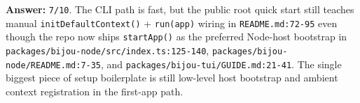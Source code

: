\textbf{Answer:} \texttt{7\allowbreak{}/\allowbreak{}1\allowbreak{}0}. The CLI path is fast, but the public root quick start still teaches manual \texttt{i\allowbreak{}n\allowbreak{}i\allowbreak{}t\allowbreak{}D\allowbreak{}e\allowbreak{}f\allowbreak{}a\allowbreak{}u\allowbreak{}l\allowbreak{}t\allowbreak{}C\allowbreak{}o\allowbreak{}n\allowbreak{}t\allowbreak{}e\allowbreak{}x\allowbreak{}t\allowbreak{}(\allowbreak{})} + \texttt{r\allowbreak{}u\allowbreak{}n\allowbreak{}(\allowbreak{}a\allowbreak{}p\allowbreak{}p\allowbreak{})} wiring in \texttt{R\allowbreak{}E\allowbreak{}A\allowbreak{}D\allowbreak{}M\allowbreak{}E\allowbreak{}.\allowbreak{}m\allowbreak{}d\allowbreak{}:\allowbreak{}7\allowbreak{}2\allowbreak{}-\allowbreak{}9\allowbreak{}5} even though the repo now ships \texttt{s\allowbreak{}t\allowbreak{}a\allowbreak{}r\allowbreak{}t\allowbreak{}A\allowbreak{}p\allowbreak{}p\allowbreak{}(\allowbreak{})} as the preferred Node-host bootstrap in \texttt{p\allowbreak{}a\allowbreak{}c\allowbreak{}k\allowbreak{}a\allowbreak{}g\allowbreak{}e\allowbreak{}s\allowbreak{}/\allowbreak{}b\allowbreak{}i\allowbreak{}j\allowbreak{}o\allowbreak{}u\allowbreak{}-\allowbreak{}n\allowbreak{}o\allowbreak{}d\allowbreak{}e\allowbreak{}/\allowbreak{}s\allowbreak{}r\allowbreak{}c\allowbreak{}/\allowbreak{}i\allowbreak{}n\allowbreak{}d\allowbreak{}e\allowbreak{}x\allowbreak{}.\allowbreak{}t\allowbreak{}s\allowbreak{}:\allowbreak{}1\allowbreak{}2\allowbreak{}5\allowbreak{}-\allowbreak{}1\allowbreak{}4\allowbreak{}0}, \texttt{p\allowbreak{}a\allowbreak{}c\allowbreak{}k\allowbreak{}a\allowbreak{}g\allowbreak{}e\allowbreak{}s\allowbreak{}/\allowbreak{}b\allowbreak{}i\allowbreak{}j\allowbreak{}o\allowbreak{}u\allowbreak{}-\allowbreak{}n\allowbreak{}o\allowbreak{}d\allowbreak{}e\allowbreak{}/\allowbreak{}R\allowbreak{}E\allowbreak{}A\allowbreak{}D\allowbreak{}M\allowbreak{}E\allowbreak{}.\allowbreak{}m\allowbreak{}d\allowbreak{}:\allowbreak{}7\allowbreak{}-\allowbreak{}3\allowbreak{}5}, and \texttt{p\allowbreak{}a\allowbreak{}c\allowbreak{}k\allowbreak{}a\allowbreak{}g\allowbreak{}e\allowbreak{}s\allowbreak{}/\allowbreak{}b\allowbreak{}i\allowbreak{}j\allowbreak{}o\allowbreak{}u\allowbreak{}-\allowbreak{}t\allowbreak{}u\allowbreak{}i\allowbreak{}/\allowbreak{}G\allowbreak{}U\allowbreak{}I\allowbreak{}D\allowbreak{}E\allowbreak{}.\allowbreak{}m\allowbreak{}d\allowbreak{}:\allowbreak{}2\allowbreak{}1\allowbreak{}-\allowbreak{}4\allowbreak{}1}. The single biggest piece of setup boilerplate is still low-level host bootstrap and ambient context registration in the first-app path.

